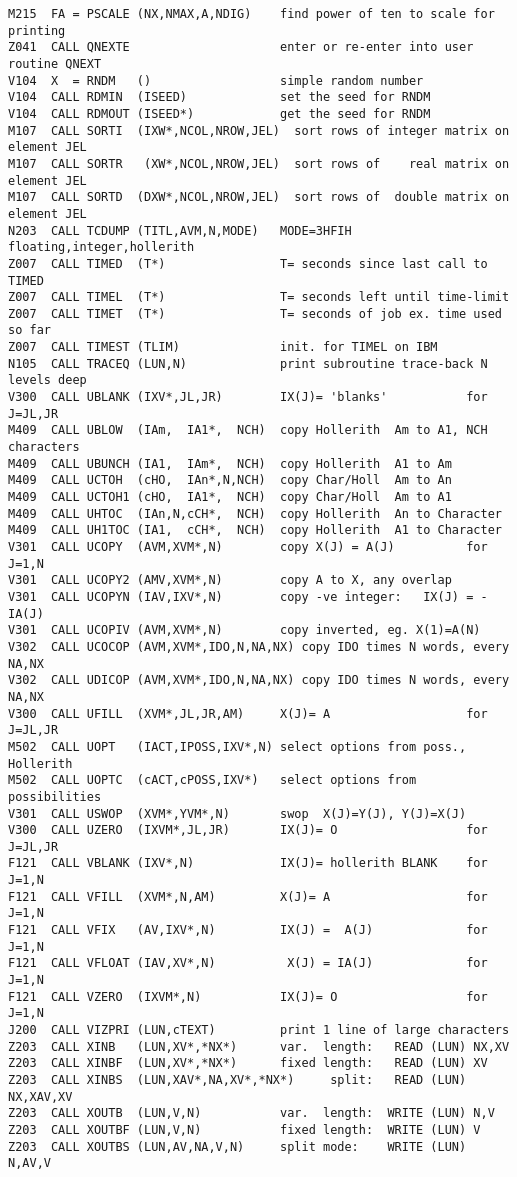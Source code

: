 \begin{verbatim}
M215  FA = PSCALE (NX,NMAX,A,NDIG)    find power of ten to scale for printing
Z041  CALL QNEXTE                     enter or re-enter into user routine QNEXT
V104  X  = RNDM   ()                  simple random number
V104  CALL RDMIN  (ISEED)             set the seed for RNDM
V104  CALL RDMOUT (ISEED*)            get the seed for RNDM
M107  CALL SORTI  (IXW*,NCOL,NROW,JEL)  sort rows of integer matrix on element JEL
M107  CALL SORTR   (XW*,NCOL,NROW,JEL)  sort rows of    real matrix on element JEL
M107  CALL SORTD  (DXW*,NCOL,NROW,JEL)  sort rows of  double matrix on element JEL
N203  CALL TCDUMP (TITL,AVM,N,MODE)   MODE=3HFIH  floating,integer,hollerith
Z007  CALL TIMED  (T*)                T= seconds since last call to TIMED
Z007  CALL TIMEL  (T*)                T= seconds left until time-limit
Z007  CALL TIMET  (T*)                T= seconds of job ex. time used so far
Z007  CALL TIMEST (TLIM)              init. for TIMEL on IBM
N105  CALL TRACEQ (LUN,N)             print subroutine trace-back N levels deep
V300  CALL UBLANK (IXV*,JL,JR)        IX(J)= 'blanks'           for J=JL,JR
M409  CALL UBLOW  (IAm,  IA1*,  NCH)  copy Hollerith  Am to A1, NCH characters
M409  CALL UBUNCH (IA1,  IAm*,  NCH)  copy Hollerith  A1 to Am
M409  CALL UCTOH  (cHO,  IAn*,N,NCH)  copy Char/Holl  Am to An
M409  CALL UCTOH1 (cHO,  IA1*,  NCH)  copy Char/Holl  Am to A1
M409  CALL UHTOC  (IAn,N,cCH*,  NCH)  copy Hollerith  An to Character
M409  CALL UH1TOC (IA1,  cCH*,  NCH)  copy Hollerith  A1 to Character
V301  CALL UCOPY  (AVM,XVM*,N)        copy X(J) = A(J)          for J=1,N
V301  CALL UCOPY2 (AMV,XVM*,N)        copy A to X, any overlap
V301  CALL UCOPYN (IAV,IXV*,N)        copy -ve integer:   IX(J) = -IA(J)
V301  CALL UCOPIV (AVM,XVM*,N)        copy inverted, eg. X(1)=A(N)
V302  CALL UCOCOP (AVM,XVM*,IDO,N,NA,NX) copy IDO times N words, every NA,NX
V302  CALL UDICOP (AVM,XVM*,IDO,N,NA,NX) copy IDO times N words, every NA,NX
V300  CALL UFILL  (XVM*,JL,JR,AM)     X(J)= A                   for J=JL,JR
M502  CALL UOPT   (IACT,IPOSS,IXV*,N) select options from poss., Hollerith
M502  CALL UOPTC  (cACT,cPOSS,IXV*)   select options from possibilities
V301  CALL USWOP  (XVM*,YVM*,N)       swop  X(J)=Y(J), Y(J)=X(J)
V300  CALL UZERO  (IXVM*,JL,JR)       IX(J)= O                  for J=JL,JR
F121  CALL VBLANK (IXV*,N)            IX(J)= hollerith BLANK    for J=1,N
F121  CALL VFILL  (XVM*,N,AM)         X(J)= A                   for J=1,N
F121  CALL VFIX   (AV,IXV*,N)         IX(J) =  A(J)             for J=1,N
F121  CALL VFLOAT (IAV,XV*,N)          X(J) = IA(J)             for J=1,N
F121  CALL VZERO  (IXVM*,N)           IX(J)= O                  for J=1,N
J200  CALL VIZPRI (LUN,cTEXT)         print 1 line of large characters
Z203  CALL XINB   (LUN,XV*,*NX*)      var.  length:   READ (LUN) NX,XV
Z203  CALL XINBF  (LUN,XV*,*NX*)      fixed length:   READ (LUN) XV
Z203  CALL XINBS  (LUN,XAV*,NA,XV*,*NX*)     split:   READ (LUN) NX,XAV,XV
Z203  CALL XOUTB  (LUN,V,N)           var.  length:  WRITE (LUN) N,V
Z203  CALL XOUTBF (LUN,V,N)           fixed length:  WRITE (LUN) V
Z203  CALL XOUTBS (LUN,AV,NA,V,N)     split mode:    WRITE (LUN) N,AV,V
\end{verbatim}

